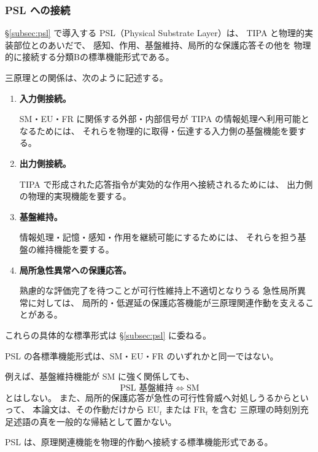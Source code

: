 \subsubsection{PSL への接続}

\begin{definition}
\label{def:principles_psl_connection}
\S\ref{subsec:psl} で導入する
PSL（Physical Substrate Layer）は、
TIPA と物理的実装部位とのあいだで、
感知、作用、基盤維持、局所的な保護応答その他を
物理的に接続する分類Bの標準機能形式である。

三原理との関係は、次のように記述する。

\begin{enumerate}

  \item
  \textbf{入力側接続。}

  SM・EU・FR に関係する外部・内部信号が
  TIPA の情報処理へ利用可能となるためには、
  それらを物理的に取得・伝達する入力側の基盤機能を要する。

  \item
  \textbf{出力側接続。}

  TIPA で形成された応答指令が実効的な作用へ接続されるためには、
  出力側の物理的実現機能を要する。

  \item
  \textbf{基盤維持。}

  情報処理・記憶・感知・作用を継続可能にするためには、
  それらを担う基盤の維持機能を要する。

  \item
  \textbf{局所急性異常への保護応答。}

  熟慮的な評価完了を待つことが可行性維持上不適切となりうる
  急性局所異常に対しては、
  局所的・低遅延の保護応答機能が三原理関連作動を支えることがある。

\end{enumerate}

これらの具体的な標準形式は \S\ref{subsec:psl} に委ねる。
\end{definition}

\begin{remark}
\label{rem:psl_not_principles}
PSL の各標準機能形式は、SM・EU・FR のいずれかと同一ではない。

例えば、基盤維持機能が SM に強く関係しても、
\[
  \text{PSL 基盤維持}
  \iff
  \mathrm{SM}
\]
とはしない。
また、局所的保護応答が急性の可行性脅威へ対処しうるからといって、
本論文は、その作動だけから $\mathrm{EU}_t$ または $\mathrm{FR}_t$ を含む
三原理の時刻別充足述語の真を一般的な帰結として置かない。

PSL は、原理関連機能を物理的作動へ接続する標準機能形式である。
\end{remark}

